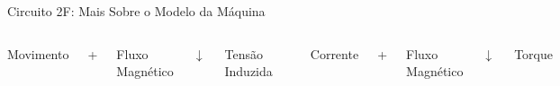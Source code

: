 \begin{frame}{Circuito 2F: Mais Sobre o Modelo da Máquina}
\centering


\begin{columns}



\centering

{\color{blue}Movimento

+

Fluxo  Magnético

$\downarrow$ 

Tensão Induzida
}





\centering


\includegraphics[width=0.85\linewidth]{./figuras/Segundo-Circuito/SIMf_dc_machine_excitation}




\centering

{\color{blue}Corrente

+

Fluxo  Magnético

$\downarrow$ 

Torque
}

\end{columns}
\end{frame}





